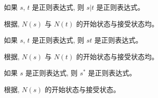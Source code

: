 \begin{frame}{}
  \begin{center}
    如果 $s$, $t$ 是正则表达式, 则 $s | t$ 是正则表达式。

    \pause
    \vspace{0.50cm}

    \pause
    \vspace{0.50cm}

    \pause
    \vspace{0.50cm}
    根据, $N(s)$ 与 $N(t)$ 的开始状态与接受状态均。
  \end{center}
\end{frame}

\begin{frame}{}
  \begin{center}
    如果 $s$, $t$ 是正则表达式, 则 $st$ 是正则表达式。

    \pause
    \vspace{0.50cm}

    \pause
    \vspace{0.50cm}
    根据, $N(s)$ 与 $N(t)$ 的开始状态与接受状态均。
  \end{center}
\end{frame}

\begin{frame}{}
  \begin{center}
    如果 $s$ 是正则表达式, 则 $s^{\ast}$ 是正则表达式。

    \pause
    \vspace{0.50cm}

    \pause
    \vspace{0.50cm}
    根据, $N(s)$ 的开始状态与接受状态。
  \end{center}
\end{frame}

